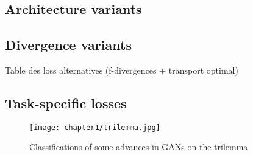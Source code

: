 \subsection{Architecture variants}

\subsection{Divergence variants}
Table des loss alternatives (f-divergences + transport optimal)

\subsection{Task-specific losses}

\begin{figure}
		\centering
	\texttt{[image: chapter1/trilemma.jpg]}
	\caption{Classifications of some advances in GANs on the trilemma}
\end{figure}




